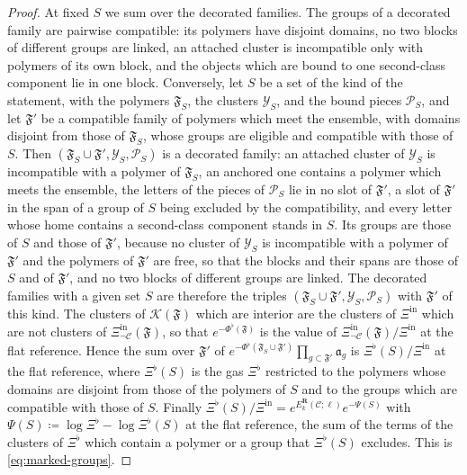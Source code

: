 \documentclass[11pt]{preprint}
\numberwithin{equation}{section}
\theoremstyle{definition}
\theoremstyle{remark}
\theoremstyle{plain}
\begin{document}
\begin{proof}
At fixed $S$ we sum over the decorated families. The groups of a decorated family are pairwise compatible: its polymers have disjoint domains, no two blocks of different groups are linked, an attached cluster is incompatible only with polymers of its own block, and the objects which are bound to one second-class component lie in one block. Conversely, let $S$ be a set of the kind of the statement, with the polymers $\mathfrak F_S$, the clusters $\mathcal Y_S$, and the bound pieces $\mathcal P_S$, and let $\mathfrak F'$ be a compatible family of polymers which meet the ensemble, with domains disjoint from those of $\mathfrak F_S$, whose groups are eligible and compatible with those of $S$. Then $(\mathfrak F_S \cup \mathfrak F', \mathcal Y_S, \mathcal P_S)$ is a decorated family: an attached cluster of $\mathcal Y_S$ is incompatible with a polymer of $\mathfrak F_S$, an anchored one contains a polymer which meets the ensemble, the letters of the pieces of $\mathcal P_S$ lie in no slot of $\mathfrak F'$, a slot of $\mathfrak F'$ in the span of a group of $S$ being excluded by the compatibility, and every letter whose home contains a second-class component stands in $S$. Its groups are those of $S$ and those of $\mathfrak F'$, because no cluster of $\mathcal Y_S$ is incompatible with a polymer of $\mathfrak F'$ and the polymers of $\mathfrak F'$ are free, so that the blocks and their spans are those of $S$ and of $\mathfrak F'$, and no two blocks of different groups are linked. The decorated families with a given set $S$ are therefore the triples $(\mathfrak F_S \cup \mathfrak F', \mathcal Y_S, \mathcal P_S)$ with $\mathfrak F'$ of this kind. The clusters of $\mathcal K(\mathfrak F)$ which are interior are the clusters of $\Xi^{\mathrm{in}}$ which are not clusters of $\Xi^{\mathrm{in}}_{\neg\mathcal C}(\mathfrak F)$, so that $e^{-\Phi^\flat(\mathfrak F)}$ is the value of $\Xi^{\mathrm{in}}_{\neg\mathcal C}(\mathfrak F)/\Xi^{\mathrm{in}}$ at the flat reference. Hence the sum over $\mathfrak F'$ of $e^{-\Phi^\flat(\mathfrak F_S \cup \mathfrak F')}\prod_{g \subset \mathfrak F'}\mathfrak a_g$ is $\Xi^\flat(S)/\Xi^{\mathrm{in}}$ at the flat reference, where $\Xi^\flat(S)$ is the gas $\Xi^\flat$ restricted to the polymers whose domains are disjoint from those of the polymers of $S$ and to the groups which are compatible with those of $S$. Finally $\Xi^\flat(S)/\Xi^{\mathrm{in}} = e^{E^{\mathbf R}_k(\mathcal C; \ell)}e^{-\Psi(S)}$ with $\Psi(S) \coloneqq \log\Xi^\flat - \log\Xi^\flat(S)$ at the flat reference, the sum of the terms of the clusters of $\Xi^\flat$ which contain a polymer or a group that $\Xi^\flat(S)$ excludes. This is \eqref{eq:marked-groups}.


\end{proof}
\end{document}
